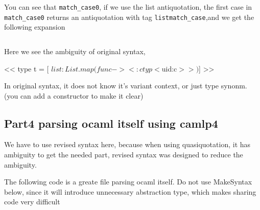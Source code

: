 You can see that \verb|match_case0|, if we use the list antiquotation,
the first case in \verb|match_case0| returns an antiquotation with tag
\verb|listmatch_case|,and we get the following expansion


\inputminted{ocaml}{camlp4/code/jake/antiquot_expander.ml}

Here we see the ambiguity of original syntax,

\begin{bluetext}
<< type t = [ $list:List.map (fun c -> <:ctyp< $uid:c$ >>)$]  >>
\end{bluetext}

In original syntax, it does not know it's variant context, or just
type synonm. (you can add a constructor to make it clear)

\subsection{Part4 parsing ocaml itself using camlp4}

We have to use revised syntax here, because when using quasiquotation,
it has ambiguity to get the needed part, revised syntax was designed
to reduce the ambiguity. 

The following code is a greate file parsing ocaml itself.
Do not use MakeSyntax below, since it will introduce unnecessary
abstraction type, which makes sharing code very difficult

\inputminted{ocaml}{camlp4/code/jake/otags.ml}


